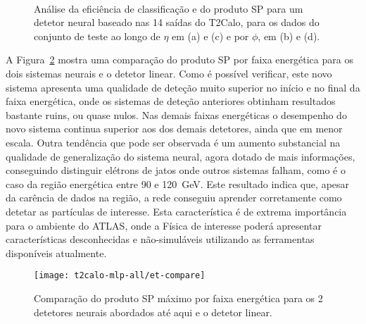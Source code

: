 \begin{figure}
\begin{center}
\mbox{%
}
\mbox{%
}
\end{center}
\caption{Análise da eficiência de classificação e do produto SP para um
detetor neural baseado nas 14 saídas do T2Calo, para os dados do conjunto de
teste ao longo de $\eta$ em (a) e (c) e por $\phi$, em (b) e (d).}
\label{fig:t2calo-mlp-eta-phi}
\end{figure}


A Figura~\ref{fig:t2calo-mlp-all-energy-comp} mostra uma comparação do produto
SP por faixa energética para os dois sistemas neurais e o detetor linear. Como
é possível verificar, este novo sistema apresenta uma qualidade de deteção
muito superior no início e no final da faixa energética, onde os sistemas de
deteção anteriores obtinham resultados bastante ruins, ou quase nulos. Nas
demais faixas energéticas o desempenho do novo sistema continua superior aos
dos demais detetores, ainda que em menor escala. Outra tendência que pode ser
observada é um aumento substancial na qualidade de generalização do sistema
neural, agora dotado de mais informações, conseguindo distinguir elétrons de
jatos onde outros sistemas falham, como é o caso da região energética entre 90
e 120~GeV. Este resultado indica que, apesar da carência de dados na região, a
rede conseguiu aprender corretamente como detetar as partículas de
interesse. Esta característica é de extrema importância para o ambiente do
ATLAS, onde a Física de interesse poderá apresentar características
desconhecidas e não-simuláveis utilizando as ferramentas disponíveis
atualmente.

\begin{figure}
\begin{center}
\texttt{[image: t2calo-mlp-all/et-compare]}
\end{center}
\caption{Comparação do produto SP máximo por faixa energética para os 2
detetores neurais abordados até aqui e o detetor linear.}
\label{fig:t2calo-mlp-all-energy-comp}
\end{figure}

